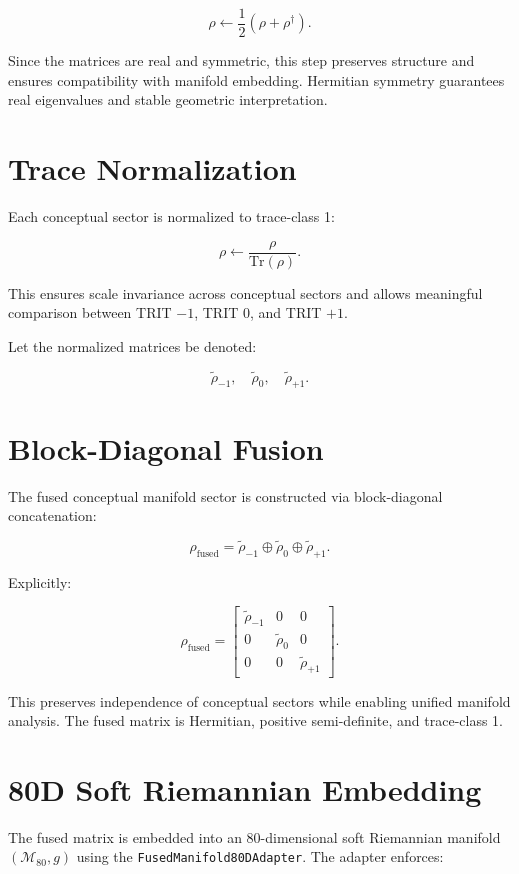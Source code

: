 \documentclass[11pt]{article}
\begin{document}
\[
\rho \leftarrow \frac{1}{2}(\rho + \rho^\dagger).
\]

Since the matrices are real and symmetric, this step preserves structure and ensures
compatibility with manifold embedding. Hermitian symmetry guarantees real eigenvalues
and stable geometric interpretation.

\section{Trace Normalization}

Each conceptual sector is normalized to trace-class 1:

\[
\rho \leftarrow \frac{\rho}{\mathrm{Tr}(\rho)}.
\]

This ensures scale invariance across conceptual sectors and allows meaningful comparison
between TRIT $-1$, TRIT $0$, and TRIT $+1$.

Let the normalized matrices be denoted:

\[
\tilde{\rho}_{-1}, \quad \tilde{\rho}_{0}, \quad \tilde{\rho}_{+1}.
\]

\section{Block-Diagonal Fusion}

The fused conceptual manifold sector is constructed via block-diagonal concatenation:

\[
\rho_{\text{fused}} =
\tilde{\rho}_{-1} \oplus \tilde{\rho}_{0} \oplus \tilde{\rho}_{+1}.
\]

Explicitly:

\[
\rho_{\text{fused}} =
\begin{bmatrix}
\tilde{\rho}_{-1} & 0 & 0 \\
0 & \tilde{\rho}_{0} & 0 \\
0 & 0 & \tilde{\rho}_{+1}
\end{bmatrix}.
\]

This preserves independence of conceptual sectors while enabling unified manifold
analysis. The fused matrix is Hermitian, positive semi-definite, and trace-class 1.

\section{80D Soft Riemannian Embedding}

The fused matrix is embedded into an 80-dimensional soft Riemannian manifold
$(\mathcal{M}_{80}, g)$ using the \texttt{FusedManifold80DAdapter}. The adapter enforces:
\end{document}

